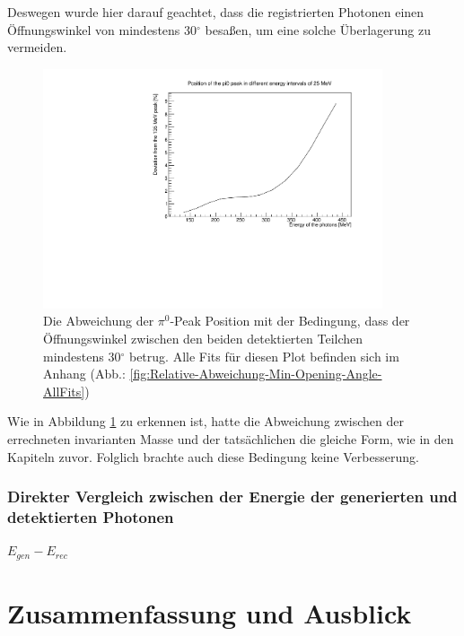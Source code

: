 \documentclass[a4paper,11pt,oneside,final,german,openbib,pdftex]{scrbook}
\begin{document}
{Deswegen wurde hier darauf geachtet, dass die registrierten Photonen einen \"Offnungswinkel von mindestens 30$^{\circ}$ besa{\ss}en, um eine solche \"Uberlagerung zu vermeiden.


\begin{figure}[h!]
	\begin{center}
		\includegraphics[width=100mm]{20171804MinOpeningAngleDeviation}
		\caption{Die Abweichung der $\pi^0$-Peak Position mit der Bedingung, dass der \"Offnungswinkel zwischen den beiden detektierten Teilchen mindestens 30$^{\circ}$ betrug. Alle Fits f\"ur diesen Plot befinden sich im Anhang (Abb.: \ref{fig:Relative-Abweichung-Min-Opening-Angle-AllFits})}
		\label{fig:Relative-Abweichung-Min-Opening-Angle}
	\end{center}
\end{figure}

Wie in Abbildung \ref{fig:Relative-Abweichung-Min-Opening-Angle} zu erkennen ist, hatte die Abweichung zwischen der errechneten invarianten Masse und der tats\"achlichen die gleiche Form, wie in den Kapiteln zuvor. Folglich brachte auch diese Bedingung keine Verbesserung.

\subsection{Direkter Vergleich zwischen der Energie der generierten und detektierten Photonen}
\label{sec-Vergleich-Energie-gen-rec}
 $E_{gen} - E_{rec}$
\chapter{Zusammenfassung und Ausblick}


}
\end{document}
